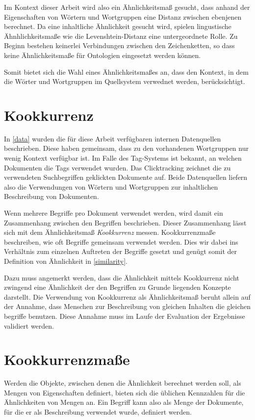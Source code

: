 Im Kontext dieser Arbeit wird also ein Ähnlichkeitsmaß gesucht, dass anhand der Eigenschaften von Wörtern und Wortgruppen eine Distanz zwischen ebenjenen berechnet. Da eine inhaltliche Ähnlichkeit gesucht wird, spielen lingustische Ähnhlichkeitsmaße wie die Levenshtein-Distanz eine untergeordnete Rolle. Zu Beginn bestehen keinerlei Verbindungen zwischen den Zeichenketten, so dass keine Ähnlichkeitsmaße für Ontologien eingesetzt werden können.

Somit bietet sich die Wahl eines Ähnlichkeitsmaßes an, dass den Kontext, in dem die Wörter und Wortgruppen im Quellsystem verwednet werden, berücksichtigt.

\section{Kookkurrenz}

In \ref{data} wurden die für diese Arbeit verfügbaren internen Datenquellen beschrieben. Diese haben gemeinsam, dass zu den vorhandenen Wortgruppen nur wenig Kontext verfügbar ist. Im Falle des Tag-Systems ist bekannt, an welchen Dokumenten die Tags verwendet wurden. Das Clicktracking zeichnet die zu verwendeten Suchbegriffen geklickten Dokumente auf. Beide Datenquellen liefern also die Verwendungen von Wörtern und Wortgruppen zur inhaltlichen Beschreibung von Dokumenten.

Wenn mehrere Begriffe pro Dokument verwendet werden, wird damit ein Zusammenhang zwischen den Begriffen beschrieben. Dieser Zusammenhang lässt sich mit dem Ähnlichkeitsmaß \emph{Kookkurrenz} messen. Kookkurrenzmaße beschreiben, wie oft Begriffe gemeinsam verwendet werden. Dies wir dabei ins Verhältnis zum einzelnen Auftreten der Begriffe gesetzt und genügt somit der Definition von Ähnlichkeit in \ref{similarity}.

Dazu muss angemerkt werden, dass die Ähnlichkeit mittels Kookkurrenz nicht zwingend eine Ähnlichkeit der den Begriffen zu Grunde liegenden Konzepte darstellt. Die Verwendung von Kookkurrenz als Ähnlichkeitsmaß beruht allein auf der Annahme, dass Menschen zur Beschreibung von gleichen Inhalten die gleichen begriffe benutzen. Diese Annahme muss im Laufe der Evaluation der Ergebnisse validiert werden.

\section{Kookkurrenzmaße}
\label{measures}

Werden die Objekte, zwischen denen die Ähnlichkeit berechnet werden soll, als Mengen von Eigenschaften definiert, bieten sich die üblichen Kennzahlen für die Ähnlichkeiten von Mengen an. Ein Begriff kann also als Menge der Dokumente, für die er als Beschreibung verwendet wurde, definiert werden.

